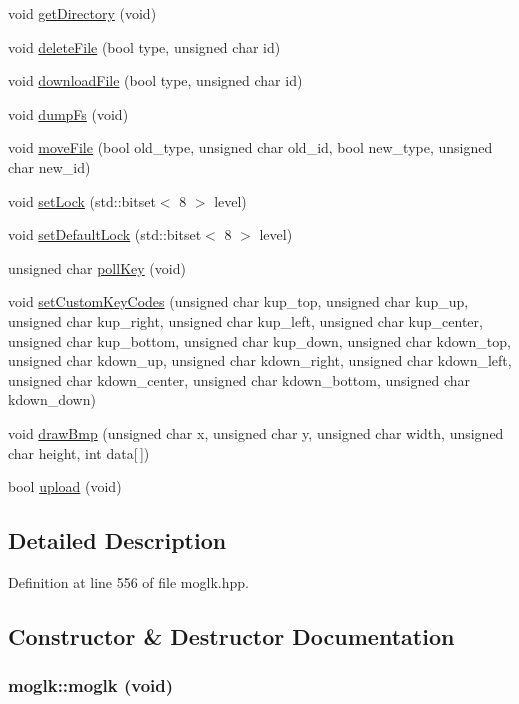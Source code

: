 \begin{CompactItemize}
\item 
void \hyperlink{classmoglk_06a6671f138121034a345e2cbd6497f8}{getDirectory} (void)
\item 
void \hyperlink{classmoglk_a1953b9ffbeb39433686cb30fe72cdab}{deleteFile} (bool type, unsigned char id)
\item 
void \hyperlink{classmoglk_f8a03d73de173bee806acf9d51cba608}{downloadFile} (bool type, unsigned char id)
\item 
void \hyperlink{classmoglk_7f929ca25d08f1c116cd43152b7373f3}{dumpFs} (void)
\item 
void \hyperlink{classmoglk_c2bcc785f03c46e32f27486704bd559a}{moveFile} (bool old\_\-type, unsigned char old\_\-id, bool new\_\-type, unsigned char new\_\-id)
\item 
void \hyperlink{classmoglk_a9d4351888605654a20b9d3e46160ce3}{setLock} (std::bitset$<$ 8 $>$ level)
\item 
void \hyperlink{classmoglk_1f658975ec72ee94a416e03b80d940ec}{setDefaultLock} (std::bitset$<$ 8 $>$ level)
\item 
unsigned char \hyperlink{classmoglk_7892be0a8494f02f08f57981d31932cd}{pollKey} (void)
\item 
void \hyperlink{classmoglk_fbe1a25a8d461d02dd84df8b7a8b796b}{setCustomKeyCodes} (unsigned char kup\_\-top, unsigned char kup\_\-up, unsigned char kup\_\-right, unsigned char kup\_\-left, unsigned char kup\_\-center, unsigned char kup\_\-bottom, unsigned char kup\_\-down, unsigned char kdown\_\-top, unsigned char kdown\_\-up, unsigned char kdown\_\-right, unsigned char kdown\_\-left, unsigned char kdown\_\-center, unsigned char kdown\_\-bottom, unsigned char kdown\_\-down)
\item 
void \hyperlink{classmoglk_38ad099b570c6f81d9a5ae6251ae77d1}{drawBmp} (unsigned char x, unsigned char y, unsigned char width, unsigned char height, int data\mbox{[}$\,$\mbox{]})
\item 
bool \hyperlink{classmoglk_a133809f7d934231f03f1d59fbc88f75}{upload} (void)
\end{CompactItemize}


\subsection{Detailed Description}


Definition at line 556 of file moglk.hpp.

\subsection{Constructor \& Destructor Documentation}
\hypertarget{classmoglk_3f753134676c7d36a96e6d4439cc0348}{
\subsubsection[{moglk}]{\setlength{\rightskip}{0pt plus 5cm}moglk::moglk (void)}}
\label{classmoglk_3f753134676c7d36a96e6d4439cc0348}




